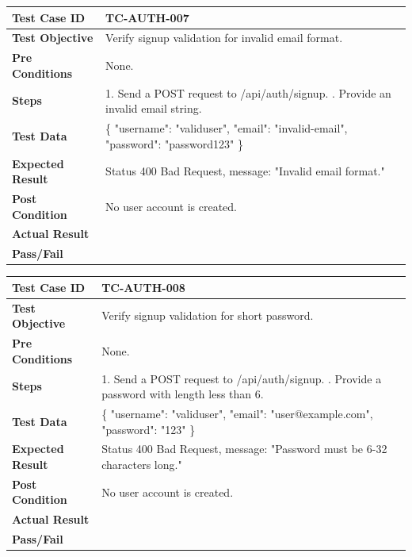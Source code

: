 \begin{longtable}{|p{}|p{}|}
\hline
\textbf{Test Case ID} & TC-AUTH-007 \\ \hline
\textbf{Test Objective} & Verify signup validation for invalid email format. \\ \hline
\textbf{Pre Conditions} & None. \\ \hline
\textbf{Steps} & 
1. Send a POST request to /api/auth/signup. \newline
2. Provide an invalid email string. \\ \hline
\textbf{Test Data} & \{ "username": "validuser", "email": "invalid-email", "password": "password123" \} \\ \hline
\textbf{Expected Result} & Status 400 Bad Request, message: "Invalid email format." \\ \hline
\textbf{Post Condition} & No user account is created. \\ \hline
\textbf{Actual Result} &  \\ \hline
\textbf{Pass/Fail} &  \\ \hline
\end{longtable}

\begin{longtable}{|p{}|p{}|}
\hline
\textbf{Test Case ID} & TC-AUTH-008 \\ \hline
\textbf{Test Objective} & Verify signup validation for short password. \\ \hline
\textbf{Pre Conditions} & None. \\ \hline
\textbf{Steps} & 
1. Send a POST request to /api/auth/signup. \newline
2. Provide a password with length less than 6. \\ \hline
\textbf{Test Data} & \{ "username": "validuser", "email": "user@example.com", "password": "123" \} \\ \hline
\textbf{Expected Result} & Status 400 Bad Request, message: "Password must be 6-32 characters long." \\ \hline
\textbf{Post Condition} & No user account is created. \\ \hline
\textbf{Actual Result} &  \\ \hline
\textbf{Pass/Fail} &  \\ \hline
\end{longtable}

